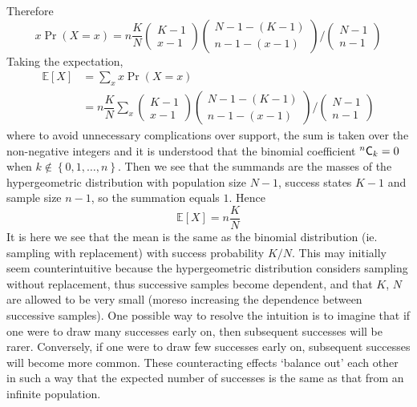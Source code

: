 \documentclass[11pt]{report} %
\begin{document}
Therefore
\begin{equation}
x\operatorname{Pr}\left(X=x\right)=n\dfrac{K}{N}\begin{pmatrix}K-1\\
x-1
\end{pmatrix}\begin{pmatrix}N-1-\left(K-1\right)\\
n-1-\left(x-1\right)
\end{pmatrix}/\begin{pmatrix}N-1\\
n-1
\end{pmatrix}
\end{equation}
Taking the expectation,
\begin{align}
\mathbb{E}\left[X\right] &= \sum_{x}x\operatorname{Pr}\left(X=x\right) \\
&= n\dfrac{K}{N}\sum_{x}\begin{pmatrix}K-1\\
x-1
\end{pmatrix}\begin{pmatrix}N-1-\left(K-1\right)\\
n-1-\left(x-1\right)
\end{pmatrix}/\begin{pmatrix}N-1\\
n-1
\end{pmatrix}
\end{align}
where to avoid unnecessary complications over support, the sum is taken over the non-negative integers and it is understood that the binomial coefficient $\mathstrut^{n}\mathsf{C}_{k} = 0$ when $k \not\in \left\{0, 1, \dots, n\right\}$. Then we see that the summands are the masses of the hypergeometric distribution with population size $N - 1$, success states $K - 1$ and sample size $n - 1$, so the summation equals $1$. Hence
\begin{equation}
\mathbb{E}\left[X\right]=n\dfrac{K}{N}
\end{equation}
It is here we see that the mean is the same as the binomial distribution (ie. sampling with replacement) with success probability $K/N$. This may initially seem counterintuitive because the hypergeometric distribution considers sampling without replacement, thus successive samples become dependent, and that $K$, $N$ are allowed to be very small (moreso increasing the dependence between successive samples). One possible way to resolve the intuition is to imagine that if one were to draw many successes early on, then subsequent successes will be rarer. Conversely, if one were to draw few successes early on, subsequent successes will become more common. These counteracting effects `balance out' each other in such a way that the expected number of successes is the same as that from an infinite population.
\end{document}
